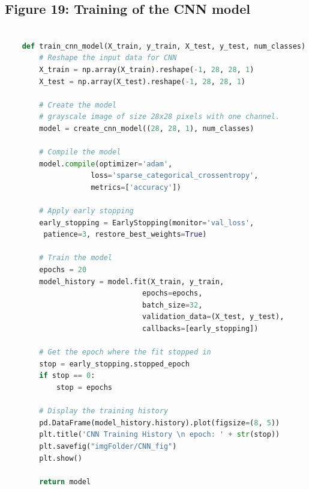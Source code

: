 \documentclass{article}
\begin{document}
\subsection{Figure 19: Training of the CNN model}
\begin{lstlisting}[language=Python]
    
    def train_cnn_model(X_train, y_train, X_test, y_test, num_classes):
        # Reshape the input data for CNN
        X_train = np.array(X_train).reshape(-1, 28, 28, 1)
        X_test = np.array(X_test).reshape(-1, 28, 28, 1)

        # Create the model
        # grayscale image of size 28x28 pixels with one channel.
        model = create_cnn_model((28, 28, 1), num_classes)  

        # Compile the model
        model.compile(optimizer='adam',
                    loss='sparse_categorical_crossentropy',
                    metrics=['accuracy'])

        # Apply early stopping
        early_stopping = EarlyStopping(monitor='val_loss',
         patience=3, restore_best_weights=True)

        # Train the model
        epochs = 20
        model_history = model.fit(X_train, y_train,
                                epochs=epochs,
                                batch_size=32,
                                validation_data=(X_test, y_test),
                                callbacks=[early_stopping])

        # Get the epoch where the fit stopped in
        stop = early_stopping.stopped_epoch
        if stop == 0:
            stop = epochs

        # Display the training history
        pd.DataFrame(model_history.history).plot(figsize=(8, 5))
        plt.title('CNN Training History \n epoch: ' + str(stop))
        plt.savefig("imgFolder/CNN_fig")
        plt.show()

        return model
\end{lstlisting}
\end{document}
